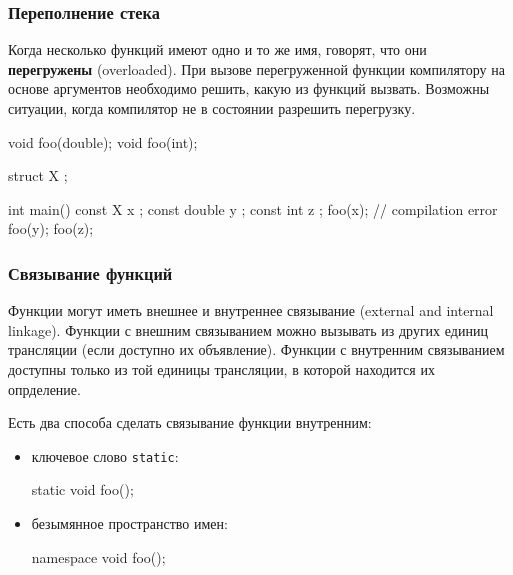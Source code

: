 \documentclass[compress, 8pt]{beamer}
\begin{document}
\begin{frame}[fragile]

    \frametitle{Переполнение стека}

    Когда несколько функций имеют одно и то же имя, говорят, что они
    \textbf{перегружены}\footnotemark{} (overloaded).
    При вызове перегруженной функции компилятору на основе аргументов
    необходимо решить, какую из функций вызвать.
    Возможны ситуации, когда компилятор не в состоянии разрешить перегрузку.


    \begin{myinplacelisting}[minted language=cpp]
void foo(double);
void foo(int);

struct X {};

int main() {
    const X x {};
    const double y {};
    const int z {};
    foo(x); // compilation error
    foo(y);
    foo(z);
}
    \end{myinplacelisting}

\end{frame}

\begin{frame}[fragile]

    \frametitle{Связывание функций}

    Функции могут иметь внешнее и внутреннее связывание (external and internal linkage).
    Функции с внешним связыванием можно вызывать из других единиц трансляции
    (если доступно их объявление).
    Функции с внутренним связыванием доступны только из той единицы трансляции,
    в которой находится их опрделение.

    \hfill\break
    Есть два способа сделать связывание функции внутренним:

    \begin{itemize}

        \item ключевое слово \verb|static|:
            \begin{myinplacelisting}[minted language=cpp]
static void foo();
            \end{myinplacelisting}

        \item безымянное пространство имен:
            \begin{myinplacelisting}[minted language=cpp]
namespace {
    void foo();
}
            \end{myinplacelisting}

    \end{itemize}

\end{frame}
\end{document}
